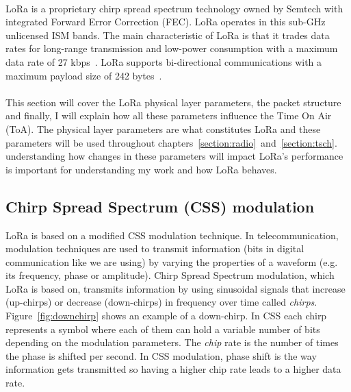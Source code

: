 \paragraph{}

LoRa is a proprietary chirp spread spectrum technology owned by Semtech with
integrated Forward Error Correction (FEC).
LoRa operates in this sub-GHz unlicensed ISM bands. %
The main characteristic of LoRa is that it trades data rates for long-range
transmission and low-power consumption with a maximum data rate of
27 kbps~\cite{8030482}.
LoRa supports bi-directional communications with a maximum payload size of 242
bytes~\cite{loraalliance:lorawanspecification}.

\paragraph{}

This section will cover the LoRa physical layer parameters, the packet
structure and finally, I will explain how all these parameters influence the
Time On Air (ToA).
The physical layer parameters are what constitutes LoRa and these parameters
will be used throughout
chapters~\ref{section:radio}~and~\ref{section:tsch}.
understanding how changes in these parameters will impact LoRa's performance
is important for understanding my work and how LoRa behaves.

\subsection{Chirp Spread Spectrum (CSS) modulation}

LoRa is based on a modified CSS modulation technique.
In telecommunication, modulation techniques are used to transmit information (bits in digital communication like we are using)
by varying the properties of a waveform (e.g. its frequency, phase or amplitude).
Chirp Spread Spectrum modulation, which LoRa is based on, transmits information
by using sinusoidal signals that increase (up-chirps) or decrease (down-chirps)
in frequency over time called \emph{chirps}.
Figure~\ref{fig:downchirp} shows an example of a down-chirp.
In CSS each chirp represents a symbol where each of them can hold a variable number
of bits depending on the modulation parameters.
The \emph{chip} rate is the number of times the phase is shifted per second.
In CSS modulation, phase shift is the way information gets transmitted so having
a higher chip rate leads to a higher data rate.

